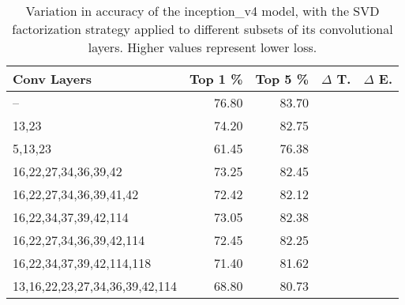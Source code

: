\begin{table}
\centering
\begin{tabular}{|l|r|r|r|r|}
\hline
Conv Layers & Top 1 \% & Top 5 \% & $\Delta$ T. & $\Delta$ E. \\\hline
-- & 76.80 & 83.70 &  & \\\hline
13,23 & 74.20 & 82.75 &  &  \\\hline
5,13,23 & 61.45 & 76.38 &  &  \\\hline
16,22,27,34,36,39,42 & 73.25 & 82.45 &  &  \\\hline
16,22,27,34,36,39,41,42 & 72.42 & 82.12 &  &  \\\hline
16,22,34,37,39,42,114 & 73.05 & 82.38 &  &  \\\hline
16,22,27,34,36,39,42,114 & 72.45 & 82.25 &  &  \\\hline
16,22,34,37,39,42,114,118 & 71.40 & 81.62 &  &  \\\hline
13,16,22,23,27,34,36,39,42,114 & 68.80 & 80.73 &  &  \\\hline
\end{tabular}
\caption{Variation in accuracy of the inception\_v4 model, with the SVD factorization strategy applied to different subsets of its convolutional layers. Higher values represent lower loss.}
\label{inception_v4-accuracy}
\end{table}
